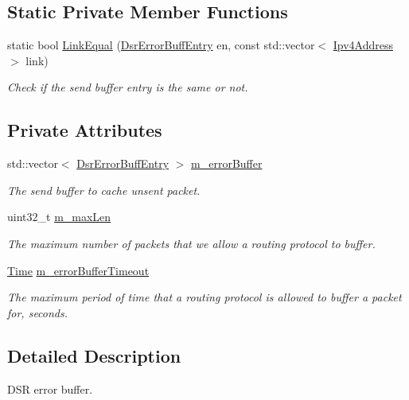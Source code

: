 \subsection*{Static Private Member Functions}
\begin{DoxyCompactItemize}
\item 
static bool \hyperlink{classns3_1_1dsr_1_1DsrErrorBuffer_a6684ddf33fc54acfef611fdd0d05ef30}{Link\+Equal} (\hyperlink{classns3_1_1dsr_1_1DsrErrorBuffEntry}{Dsr\+Error\+Buff\+Entry} en, const std\+::vector$<$ \hyperlink{classns3_1_1Ipv4Address}{Ipv4\+Address} $>$ link)
\begin{DoxyCompactList}\small\item\em Check if the send buffer entry is the same or not. \end{DoxyCompactList}\end{DoxyCompactItemize}
\subsection*{Private Attributes}
\begin{DoxyCompactItemize}
\item 
std\+::vector$<$ \hyperlink{classns3_1_1dsr_1_1DsrErrorBuffEntry}{Dsr\+Error\+Buff\+Entry} $>$ \hyperlink{classns3_1_1dsr_1_1DsrErrorBuffer_ad12853345e28cfc3174432c2e4a59830}{m\+\_\+error\+Buffer}
\begin{DoxyCompactList}\small\item\em The send buffer to cache unsent packet. \end{DoxyCompactList}\item 
uint32\+\_\+t \hyperlink{classns3_1_1dsr_1_1DsrErrorBuffer_a1f9a6f0d47dfad68c8e51e318715d3d7}{m\+\_\+max\+Len}
\begin{DoxyCompactList}\small\item\em The maximum number of packets that we allow a routing protocol to buffer. \end{DoxyCompactList}\item 
\hyperlink{classns3_1_1Time}{Time} \hyperlink{classns3_1_1dsr_1_1DsrErrorBuffer_a09ed5b125c6726bff8cf79b7569c864f}{m\+\_\+error\+Buffer\+Timeout}
\begin{DoxyCompactList}\small\item\em The maximum period of time that a routing protocol is allowed to buffer a packet for, seconds. \end{DoxyCompactList}\end{DoxyCompactItemize}


\subsection{Detailed Description}
D\+SR error buffer. 


